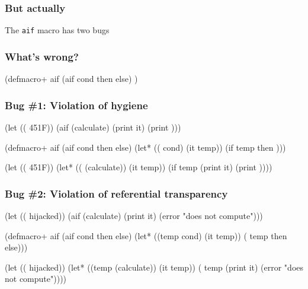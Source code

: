 \documentclass[hyperref={bookmarks=false}]{beamer}
\begin{document}
\begin{frame}[fragile]
\frametitle{But actually}
The \texttt{aif} macro has two bugs
\end{frame}

\begin{frame}[fragile]
\frametitle{What's wrong?}
\begin{semiverbatim}

(defmacro+ aif
  (aif cond then else)
    )

\end{semiverbatim}
\end{frame}

\begin{frame}[fragile]
\frametitle{Bug \#1: Violation of hygiene}
\begin{semiverbatim}
(let ((\text{\color{blue}{temp}} 451{\textdegree}F))
  (aif (calculate)
    (print it)
    (print \text{\color{blue}{temp}})))

(defmacro+ aif
  (aif cond then else)
  (let* ((\text{\color{red}{temp}} cond)
         (it temp))
    (if temp then \text{\color{red}{else}})))

(let ((\text{\color{blue}{temp}} 451{\textdegree}F))
  (let* ((\text{\color{red}{temp}} (calculate))
         (it temp))
    (if temp
      (print it)
      (print \text{\color{red}{temp}}))))
\end{semiverbatim}
\end{frame}

\begin{frame}[fragile]
\frametitle{Bug \#2: Violation of referential transparency}
\begin{semiverbatim}
(let ((\text{\color{blue}{if}} hijacked))
  (aif (calculate)
    (print it)
    (error "does not compute")))

(defmacro+ aif
  (aif cond then else)
  (let* ((temp cond)
         (it temp))
    (\text{\color{red}{if}} temp then else)))

(let ((\text{\color{blue}{if}} hijacked))
  (let* ((temp (calculate))
         (it temp))
    (\text{\color{blue}{if}} temp
      (print it)
      (error "does not compute"))))
\end{semiverbatim}
\end{frame}
\end{document}
